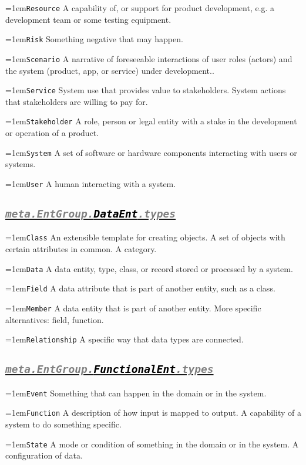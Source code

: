 \documentclass[a4paper,oneside]{article}
\newcommand\Concept[2]{\hangindent=1em\lstinline+#1+ #2}
\begin{document}
\begin{multicols*}{4}
\Concept{Resource}{A capability of, or support for product development, e.g. a development team or some testing equipment.}

\Concept{Risk}{Something negative that may happen.}

\Concept{Scenario}{A narrative of foreseeable interactions of user roles (actors) and the system (product, app, or service) under development..}

\Concept{Service}{System use that provides value to stakeholders. System actions that stakeholders are willing to pay for.}

\Concept{Stakeholder}{A role, person or legal entity with a stake in the development or operation of a product.}

\Concept{System}{A set of software or hardware components interacting with users or systems.}

\Concept{User}{A human interacting with a system.}


\subsection*{\underline{\texttt{\textit{{\textcolor{gray}{meta.EntGroup.}\textcolor{black}{DataEnt}}\textcolor{gray}{.types}}}}}
\Concept{Class}{An extensible template for creating objects. A set of objects with certain attributes in common. A category.}

\Concept{Data}{A data entity, type, class, or record stored or processed by a system.}

\Concept{Field}{A data attribute that is part of another entity, such as a class.}

\Concept{Member}{A data entity that is part of another entity. More specific alternatives: field, function.}

\Concept{Relationship}{A specific way that data types are connected.}


\subsection*{\underline{\texttt{\textit{{\textcolor{gray}{meta.EntGroup.}\textcolor{black}{FunctionalEnt}}\textcolor{gray}{.types}}}}}
\Concept{Event}{Something that can happen in the domain or in the system.}

\Concept{Function}{A description of how input is mapped to output. A capability of a system to do something specific.}

\Concept{State}{A mode or condition of something in the domain or in the system. A configuration of data.}


\end{multicols*}
\end{document}
